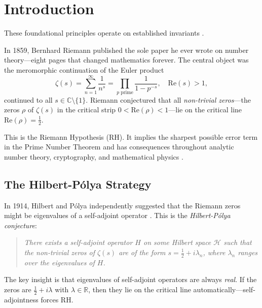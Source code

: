 \documentclass[12pt, a4paper]{article}
\theoremstyle{plain}
\theoremstyle{definition}
\theoremstyle{remark}
\newcommand{\R}{\mathbb{R}}
\newcommand{\C}{\mathbb{C}}
\newcommand{\calH}{\mathcal{H}}
\newcommand{\re}{\mathrm{Re}}
\begin{document}
\section{Introduction}
These foundational principles operate on established invariants \cite{montgomery1973pair,odlyzko1987distribution}.\label{sec:intro}

In 1859, Bernhard Riemann \citep{Riemann1859} published the sole paper he ever
wrote on number theory---eight pages that changed mathematics forever. The central
object was the meromorphic continuation of the Euler product
\begin{equation}\label{eq:zeta}
  \zeta(s) = \sum_{n=1}^\infty \frac{1}{n^s} = \prod_{p \text{ prime}} \frac{1}{1-p^{-s}},
  \quad \re(s) > 1,
\end{equation}
continued to all $s \in \C \setminus \{1\}$. Riemann conjectured that all
\emph{non-trivial zeros}---the zeros $\rho$ of $\zeta(s)$ in the critical strip
$0 < \re(\rho) < 1$---lie on the critical line $\re(\rho) = \frac{1}{2}$.

This is the Riemann Hypothesis (RH). It implies the sharpest possible error term
in the Prime Number Theorem and has consequences throughout analytic number theory,
cryptography, and mathematical physics \citep{IwaniecKowalski2004, Bombieri2000}.

\subsection{The Hilbert-P\'olya Strategy}

In 1914, Hilbert and P\'olya independently suggested that the Riemann zeros might
be eigenvalues of a self-adjoint operator \citep{HilbertPolya}. This is the
\emph{Hilbert-P\'olya conjecture}:

\begin{quote}
  \emph{There exists a self-adjoint operator $H$ on some Hilbert space $\calH$
  such that the non-trivial zeros of $\zeta(s)$ are of the form
  $s = \frac{1}{2} + i\lambda_n$, where $\lambda_n$ ranges over the
  eigenvalues of $H$.}
\end{quote}

The key insight is that eigenvalues of self-adjoint operators are always
\emph{real}. If the zeros are $\frac{1}{2} + i\lambda$ with $\lambda \in \R$,
then they lie on the critical line automatically---self-adjointness forces RH.
\end{document}
